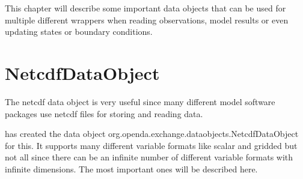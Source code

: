 
This chapter will describe some important data objects that can be used for multiple different wrappers when reading observations, model results or even updating states or boundary conditions.

\section{NetcdfDataObject}

The netcdf data object is very useful since many different model software packages use netcdf files for storing and reading data.

\oda has created the data object org.openda.exchange.dataobjects.NetcdfDataObject for this.
It supports many different variable formats like scalar and gridded but not all since there can be an infinite number of different variable formats with infinite dimensions.
The most important ones will be described here.